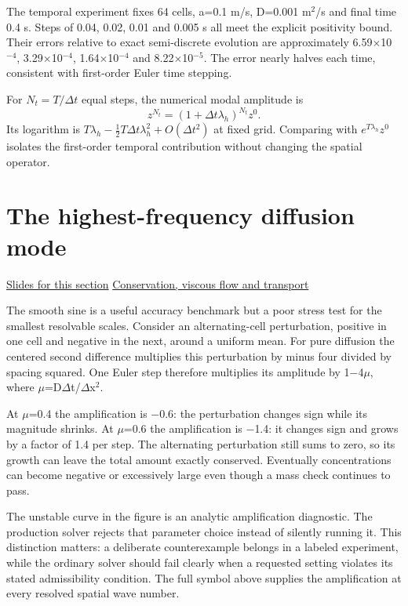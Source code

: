 \documentclass[11pt,letterpaper]{article}
\theoremstyle{definition}\newtheorem{definition}{Definition}\newtheorem{example}{Example}
\numberwithin{equation}{section}
\begin{document}
The temporal experiment fixes 64 cells, a=0.1 m/s, D=0.001 m\ensuremath{^{2}}/s and final time 0.4 s. Steps of 0.04, 0.02, 0.01 and 0.005 s all meet the explicit positivity bound. Their errors relative to exact semi-discrete evolution are approximately 6.59\ensuremath{\times}10\ensuremath{^{-4}}, 3.29\ensuremath{\times}10\ensuremath{^{-4}}, 1.64\ensuremath{\times}10\ensuremath{^{-4}} and 8.22\ensuremath{\times}10\ensuremath{^{-5}}. The error nearly halves each time, consistent with first-order Euler time stepping.

For $N_t=T/\Delta t$ equal steps, the numerical modal amplitude is
\[
 z^{N_t}=(1+\Delta t\lambda_h)^{N_t}z^0.
\]
Its logarithm is $T\lambda_h-\tfrac12T\Delta t\lambda_h^2+O(\Delta t^2)$ at fixed grid. Comparing with $e^{T\lambda_h}z^0$ isolates the first-order temporal contribution without changing the spatial operator.
\section{The highest-frequency diffusion mode}
\hypertarget{note-the-highest-frequency-diffusion-mode}{}\label{note:the-highest-frequency-diffusion-mode}
{\small \href{slides.html\#frame=a-grid-scale-perturbation\&step=1}{Slides for this section} \quad \href{../modules/cfd/index.html}{Conservation, viscous flow and transport}}\par
The smooth sine is a useful accuracy benchmark but a poor stress test for the smallest resolvable scales. Consider an alternating-cell perturbation, positive in one cell and negative in the next, around a uniform mean. For pure diffusion the centered second difference multiplies this perturbation by minus four divided by spacing squared. One Euler step therefore multiplies its amplitude by 1\ensuremath{-}4\ensuremath{\mu}, where \ensuremath{\mu}=D\ensuremath{\Delta}t/\ensuremath{\Delta}x\ensuremath{^{2}}.

At \ensuremath{\mu}=0.4 the amplification is \ensuremath{-}0.6: the perturbation changes sign while its magnitude shrinks. At \ensuremath{\mu}=0.6 the amplification is \ensuremath{-}1.4: it changes sign and grows by a factor of 1.4 per step. The alternating perturbation still sums to zero, so its growth can leave the total amount exactly conserved. Eventually concentrations can become negative or excessively large even though a mass check continues to pass.

The unstable curve in the figure is an analytic amplification diagnostic. The production solver rejects that parameter choice instead of silently running it. This distinction matters: a deliberate counterexample belongs in a labeled experiment, while the ordinary solver should fail clearly when a requested setting violates its stated admissibility condition. The full symbol above supplies the amplification at every resolved spatial wave number.
\end{document}
